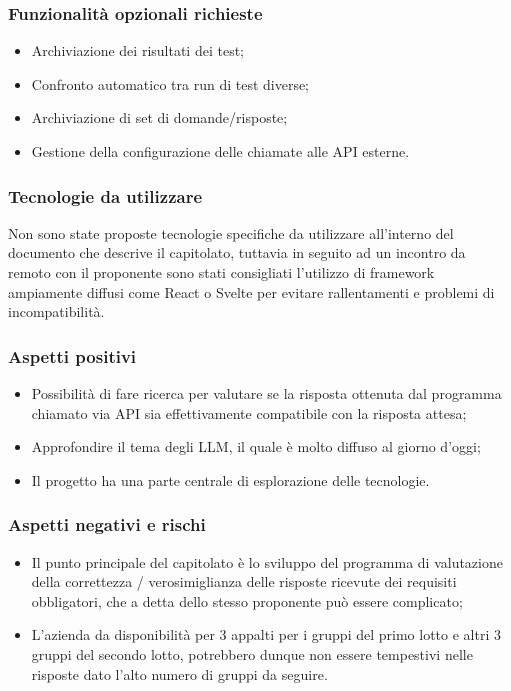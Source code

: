 \documentclass[10pt]{article}
\begin{document}
\subsubsection{Funzionalità opzionali richieste}
\begin{itemize}
    \item Archiviazione dei risultati dei test;
    \item Confronto automatico tra run di test diverse;
    \item Archiviazione di set di domande/risposte;
    \item Gestione della configurazione delle chiamate alle API esterne.
\end{itemize}
\subsubsection{Tecnologie da utilizzare}
Non sono state proposte tecnologie specifiche da utilizzare all'interno del documento che descrive il capitolato, tuttavia in seguito ad un incontro da remoto con il proponente sono stati consigliati l'utilizzo di framework ampiamente diffusi come React o Svelte per evitare rallentamenti e problemi di incompatibilità.
\subsubsection{Aspetti positivi}
\begin{itemize}
    \item Possibilità di fare ricerca per valutare se la risposta ottenuta dal programma chiamato via API sia effettivamente compatibile con la risposta attesa;
    \item Approfondire il tema degli LLM, il quale è molto diffuso al giorno d'oggi;
    \item Il progetto ha una parte centrale di esplorazione delle tecnologie.
\end{itemize}
\subsubsection{Aspetti negativi e rischi}
\begin{itemize}
    \item Il punto principale del capitolato è lo sviluppo del programma di valutazione della correttezza / verosimiglianza delle risposte ricevute dei requisiti obbligatori, che a detta dello stesso proponente può essere complicato;
    \item L'azienda da disponibilità per 3 appalti per i gruppi del primo lotto e altri 3 gruppi del secondo lotto, potrebbero dunque non essere tempestivi nelle risposte dato l'alto numero di gruppi da seguire.
\end{itemize}
\end{document}
